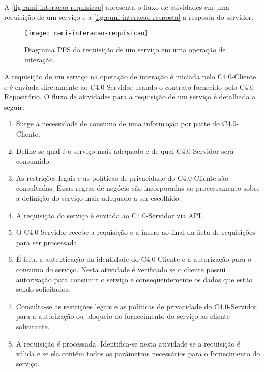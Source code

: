 A \autoref{fig:rami-interacao-requisicao} apresenta o fluxo de atividades em uma requisição de um serviço e a \autoref{fig:rami-interacao-resposta} a resposta do servidor.

\begin{figure}[htb]
	\centering
	\texttt{[image: rami-interacao-requisicao]}
	\caption{Diagrama PFS da requisição de um serviço em uma operação de interação.}
	\label{fig:rami-interacao-requisicao}
\end{figure}

A requisição de um serviço na operação de interação é iniciada pelo C4.0-Cliente e é enviada diretamente ao C4.0-Servidor usando o contrato fornecido pelo C4.0-Repositório. O fluxo de atividades para a requisição de um serviço é detalhada a seguir:

\begin{enumerate}

	\item Surge a necessidade de consumo de uma informação por parte do C4.0-Cliente.

	\item Define-se qual é o serviço mais adequado e de qual C4.0-Servidor será consumido.

	\item As restrições legais e as políticas de privacidade do C4.0-Cliente são consultadas. Essas regras de negócio são incorporadas ao processamento sobre a definição do serviço mais adequado a ser escolhido.

	\item A requisição do serviço é enviada ao C4.0-Servidor via API.

	\item O C4.0-Servidor recebe a requisição e a insere ao final da lista de requisições para ser processada.

	\item É feita a autenticação da identidade do C4.0-Cliente e a autorização para o consumo do serviço. Nesta atividade é verificado se o cliente possui autorização para consumir o serviço e consequentemente os dados que estão sendo solicitados.

	\item Consulta-se as restrições legais e as políticas de privacidade do C4.0-Servidor para a autorização ou bloqueio do fornecimento do serviço ao cliente solicitante.

	\item A requisição é processada. Identifica-se nesta atividade se a requisição é válida e se ela contém todos os parâmetros necessários para o fornecimento do serviço.

\end{enumerate}

